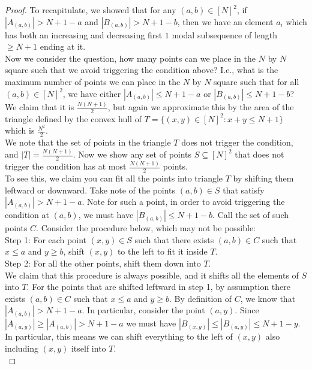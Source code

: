 \documentclass[10pt,a4paper]{amsart}
\begin{document}
\begin{proof}
To recapitulate, we showed that for any $(a,b) \in [N]^2$, if $|A_{(a,b)}| > N+1-a$ and $|B_{(a,b)}| > N+1-b$, then we have an element $a_i$ which has both an increasing and decreasing first $1$ modal subsequence of length $\geq N + 1$ ending at it. \\

Now we consider the question, how many points can we place in the $N$ by $N$ square such that we avoid triggering the condition above? I.e., what is the maximum number of points we can place in the $N$ by $N$ square such that for all $(a,b) \in [N]^2$, we have either $|A_{(a,b)}| \leq N+1-a$ or $|B_{(a,b)}| \leq N+1-b$? We claim that it is $\frac{N(N+1)}{2}$, but again we approximate this by the area of the triangle defined by the convex hull of $T = \{(x,y) \in [N]^2 : x + y \leq N+1\}$ which is $\frac{N^2}{2}$. \\

We note that the set of points in the triangle $T$ does not trigger the condition, and $|T| = \frac{N(N+1)}{2}$. Now we show any set of points $S \subseteq [N]^2$ that does not trigger the condition has at most $\frac{N(N+1)}{2}$ points. \\

To see this, we claim you can fit all the points into triangle $T$ by shifting them leftward or downward. Take note of the points $(a,b) \in S$ that satisfy $|A_{(a,b)}| > N+1-a$. Note for such a point, in order to avoid triggering the condition at $(a,b)$, we must have $|B_{(a,b)}| \leq N+1-b$. Call the set of such points $C$. Consider the procedure below, which may not be possible: \\

Step 1: For each point $(x,y) \in S$ such that there exists $(a,b) \in C$ such that $x \leq a$ and $y \geq b$, shift $(x,y)$ to the left to fit it inside $T$. \\

Step 2: For all the other points, shift them down into $T$. \\

We claim that this procedure is always possible, and it shifts all the elements of $S$ into $T$. For the points that are shifted leftward in step 1, by assumption there exists $(a,b) \in C$ such that $x \leq a$ and $y \geq b$. By definition of $C$, we know that $|A_{(a,b)}| > N+1-a$. In particular, consider the point $(a, y)$. Since $|A_{(a,y)}| \geq |A_{(a,b)}| > N+1-a$ we must have $|B_{(x,y)}| \leq |B_{(a,y)}| \leq N+1-y$. In particular, this means we can shift everything to the left of $(x,y)$ also including $(x,y)$ itself into $T$. \\


\end{proof}
\end{document}
